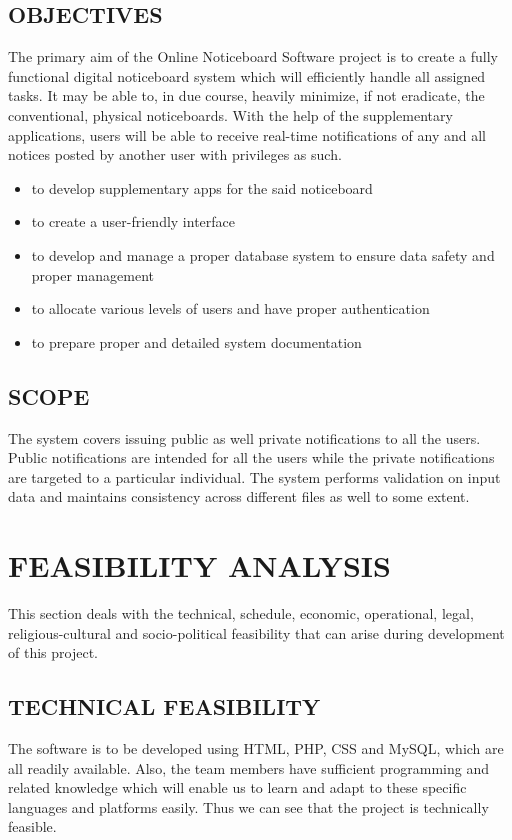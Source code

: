 \documentclass[12pt,a4paper]{article}
\begin{document}
	\subsection{OBJECTIVES}
	The primary aim of the Online Noticeboard Software project is to create a fully functional digital noticeboard system which will efficiently handle all assigned tasks. It may be able to, in due course, heavily minimize, if not eradicate, the conventional, physical noticeboards. With the help of the supplementary applications, users will be able to receive real-time notifications of any and all notices posted by another user with privileges as such.
	\begin{itemize}
		\item to develop supplementary apps for the said noticeboard
		\item to create a user-friendly interface
		\item to develop and manage a proper database system to ensure data safety and proper management
		\item to allocate various levels of users and have proper authentication
		\item to prepare proper and detailed system documentation\\
	\end{itemize}
	
	\subsection{SCOPE}
	The system covers issuing public as well private notifications to all the users. Public notifications are intended for all the users while the private notifications are targeted to a particular individual. The system performs validation on input data and maintains consistency across different files as well to some extent.

\newpage
\section{FEASIBILITY ANALYSIS}
This section deals with the technical, schedule, economic, operational, legal, religious-cultural and socio-political feasibility that can arise during development of this project.

    \subsection{TECHNICAL FEASIBILITY}
    The software is to be developed using HTML, PHP, CSS and MySQL, which are all readily available. Also, the team members have sufficient programming and related knowledge which will enable us to learn and adapt to these specific languages and platforms easily. Thus we can see that the project is technically feasible.
    
\end{document}
